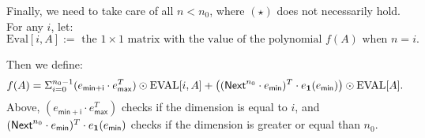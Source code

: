 Finally, we need to take care of all $n<n_0$, where $(\star)$ does not necessarily hold. For any $i$, let: $$\text{Eval}[i,A]:= \text{ the } 1\times 1 \text{ matrix with the value of the polynomial } f(A) \text{ when } n=i.$$

Then we define: $$f(A)=\Sigma_{i=0}^{n_0-1}(e_{\mathsf{min}+\mathsf{i}}\cdot e_{\mathsf{max}}^T)\odot \text{EVAL}[i,A] + \left( (\mathsf{Next}^{n_0}\cdot e_{\mathsf{min}})^T\cdot e_{\mathbf{1}} (e_{\mathsf{min}}) \right)\odot \text{EVAL}[A].$$ Above, $(e_{\mathsf{min}+\mathsf{i}}\cdot e_{\mathsf{max}}^T)$ checks if the dimension is equal to $i$, and $(\mathsf{Next}^{n_0}\cdot e_{\mathsf{min}})^T\cdot e_{\mathbf{1}} (e_{\mathsf{min}})$ checks if the dimension is greater or equal than $n_0$.












